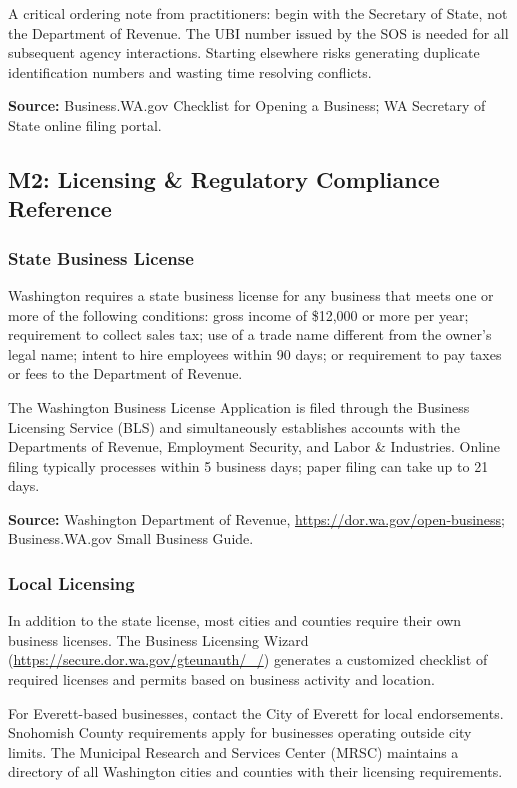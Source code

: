 \documentclass[11pt,letterpaper]{article}
\begin{document}
A critical ordering note from practitioners: begin with the Secretary of State, not the Department of Revenue. The UBI number issued by the SOS is needed for all subsequent agency interactions. Starting elsewhere risks generating duplicate identification numbers and wasting time resolving conflicts.

\textbf{Source:} Business.WA.gov Checklist for Opening a Business; WA Secretary of State online filing portal.

\subsection{M2: Licensing \& Regulatory Compliance Reference}

\subsubsection{State Business License}

Washington requires a state business license for any business that meets one or more of the following conditions: gross income of \$12,000 or more per year; requirement to collect sales tax; use of a trade name different from the owner's legal name; intent to hire employees within 90 days; or requirement to pay taxes or fees to the Department of Revenue.

The Washington Business License Application is filed through the Business Licensing Service (BLS) and simultaneously establishes accounts with the Departments of Revenue, Employment Security, and Labor \& Industries. Online filing typically processes within 5 business days; paper filing can take up to 21 days.

\textbf{Source:} Washington Department of Revenue, \url{https://dor.wa.gov/open-business}; Business.WA.gov Small Business Guide.

\subsubsection{Local Licensing}

In addition to the state license, most cities and counties require their own business licenses. The Business Licensing Wizard (\url{https://secure.dor.wa.gov/gteunauth/_/}) generates a customized checklist of required licenses and permits based on business activity and location.

For Everett-based businesses, contact the City of Everett for local endorsements. Snohomish County requirements apply for businesses operating outside city limits. The Municipal Research and Services Center (MRSC) maintains a directory of all Washington cities and counties with their licensing requirements.
\end{document}
